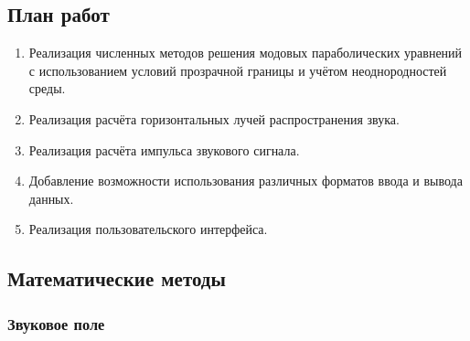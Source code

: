 \documentclass[../document.tex]{subfiles}
\begin{document}
    \subsection{План работ}
        \begin{enumerate}
            \item Реализация численных методов решения модовых параболических уравнений с использованием условий прозрачной границы и учётом неоднородностей среды.
            \item Реализация расчёта горизонтальных лучей распространения звука.
            \item Реализация расчёта импульса звукового сигнала.
            \item Добавление возможности использования различных форматов ввода и вывода данных.
            \item Реализация пользовательского интерфейса.
        \end{enumerate}
    \subsection{Математические методы}
        \subsubsection{Звуковое поле}
\end{document}
